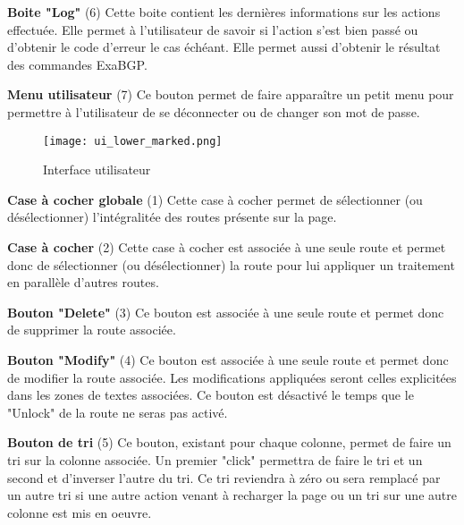 \textbf{Boite "Log"} (6)\newline
Cette boite contient les dernières informations sur les actions effectuée. Elle permet à l'utilisateur de savoir si l'action s'est bien passé ou d'obtenir le code d'erreur le cas échéant.
Elle permet aussi d'obtenir le résultat des commandes ExaBGP.\newline

\textbf{Menu utilisateur} (7)\newline
Ce bouton permet de faire apparaître un petit menu pour permettre à l'utilisateur de se déconnecter ou de changer son mot de passe.

\begin{figure}[H]
    \texttt{[image: ui\_lower\_marked.png]}
    \caption{Interface utilisateur}
    \label{fig:ui_lower}
\end{figure}

\textbf{Case à cocher globale} (1)\newline
Cette case à cocher permet de sélectionner (ou désélectionner) l'intégralitée des routes présente sur la page.\newline

\textbf{Case à cocher} (2)\newline
Cette case à cocher est associée à une seule route et permet donc de sélectionner (ou désélectionner) la route pour lui appliquer un traitement en parallèle d'autres routes.\newline

\textbf{Bouton "Delete"} (3)\newline
Ce bouton est associée à une seule route et permet donc de supprimer la route associée.\newline

\textbf{Bouton "Modify"} (4)\newline
Ce bouton est associée à une seule route et permet donc de modifier la route associée. Les modifications appliquées seront celles explicitées dans les zones de textes associées. Ce bouton est désactivé le temps que le "Unlock" de la route ne seras pas activé. \newline

\textbf{Bouton de tri} (5)\newline
Ce bouton, existant pour chaque colonne, permet de faire un tri sur la colonne associée. Un premier "click" permettra de faire le tri et un second et d'inverser l'autre du tri. Ce tri reviendra à zéro ou sera remplacé par un autre tri si une autre action venant à recharger la page ou un tri sur une autre colonne est mis en oeuvre.\newline

